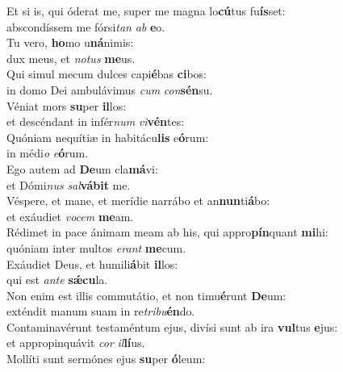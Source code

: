 \oddverse Et si is, qui óderat me, super me magna lo\textbf{cú}tus fu\textbf{ís}set:~\*\\
\oddverse abscondíssem me fórsi\textit{tan} \textit{ab} \textbf{e}o.\\
\evenverse Tu vero, \textbf{ho}mo u\textbf{ná}nimis:~\*\\
\evenverse dux meus, et \textit{no}\textit{tus} \textbf{me}us.\\
\oddverse Qui simul mecum dulces capi\textbf{é}bas \textbf{ci}bos:~\*\\
\oddverse in domo Dei ambulávimus \textit{cum} \textit{con}\textbf{sén}su.\\
\evenverse Véniat mors \textbf{su}per \textbf{il}los:~\*\\
\evenverse et descéndant in infér\textit{num} \textit{vi}\textbf{vén}tes:\\
\oddverse Quóniam nequítiæ in habitácu\textbf{lis} e\textbf{ó}rum:~\*\\
\oddverse in médi\textit{o} \textit{e}\textbf{ó}rum.\\
\evenverse Ego autem ad \textbf{De}um cla\textbf{má}vi:~\*\\
\evenverse et Dómi\textit{nus} \textit{sal}\textbf{vá}\textbf{bit} me.\\
\oddverse Véspere, et mane, et merídie narrábo et an\textbf{nun}ti\textbf{á}bo:~\*\\
\oddverse et exáudiet \textit{vo}\textit{cem} \textbf{me}am.\\
\evenverse Rédimet in pace ánimam meam ab his, qui appro\textbf{pín}quant \textbf{mi}hi:~\*\\
\evenverse quóniam inter multos \textit{e}\textit{rant} \textbf{me}cum.\\
\oddverse Exáudiet Deus, et humili\textbf{á}bit \textbf{il}los:~\*\\
\oddverse qui est \textit{an}\textit{te} \textbf{sǽ}\textbf{cu}la.\\
\evenverse Non enim est illis commutátio, et non timu\textbf{é}runt \textbf{De}um:~\*\\
\evenverse exténdit manum suam in re\textit{tri}\textit{bu}\textbf{én}do.\\
\oddverse Contaminavérunt testaméntum ejus, divísi sunt ab ira \textbf{vul}tus \textbf{e}jus:~\*\\
\oddverse et appropinquávit \textit{cor} \textit{il}\textbf{lí}us.\\
\evenverse Mollíti sunt sermónes ejus \textbf{su}per \textbf{ó}leum:~\*\\
